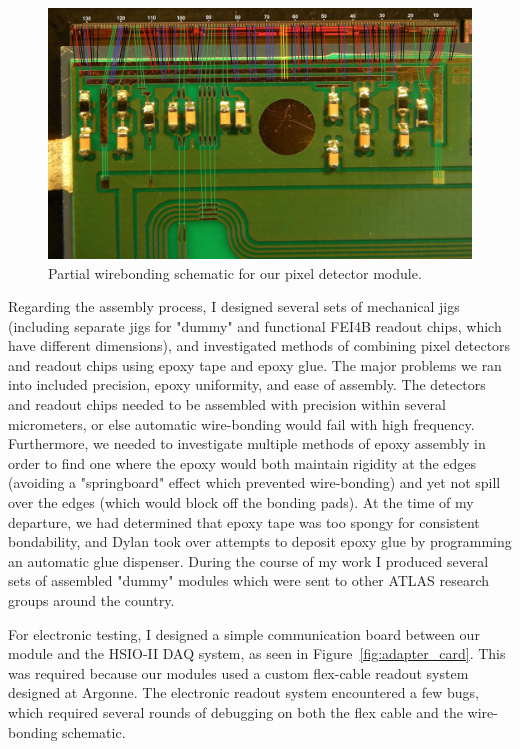 \begin{figure}[h]
    \centering
    \includegraphics[width=0.7\linewidth]{Images/Other/wire_bond.jpg}
    \caption{Partial wirebonding schematic for our pixel detector module.}
    \label{fig:wire_bond}
\end{figure}

Regarding the assembly process, I designed several sets of mechanical jigs (including separate jigs for "dummy" and functional FEI4B readout chips, which have different dimensions), and investigated methods of combining pixel detectors and readout chips using epoxy tape and epoxy glue. The major problems we ran into included precision, epoxy uniformity, and ease of assembly. The detectors and readout chips needed to be assembled with precision within several micrometers, or else automatic wire-bonding would fail with high frequency. Furthermore, we needed to investigate multiple methods of epoxy assembly in order to find one where the epoxy would both maintain rigidity at the edges (avoiding a "springboard" effect which prevented wire-bonding) and yet not spill over the edges (which would block off the bonding pads). At the time of my departure, we had determined that epoxy tape was too spongy for consistent bondability, and Dylan took over attempts to deposit epoxy glue by programming an automatic glue dispenser. During the course of my work I produced several sets of assembled "dummy" modules which were sent to other ATLAS research groups around the country.

For electronic testing, I designed a simple communication board between our module and the HSIO-II DAQ system, as seen in Figure~\ref{fig:adapter_card}. This was required because our modules used a custom flex-cable readout system designed at Argonne. The electronic readout system encountered a few bugs, which required several rounds of debugging on both the flex cable and the wire-bonding schematic.

